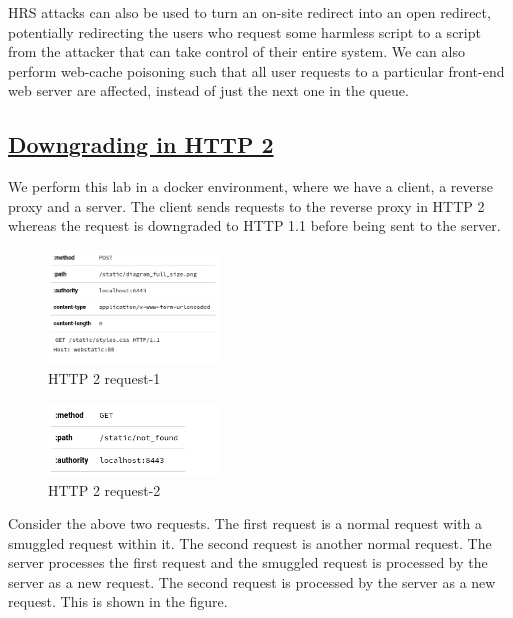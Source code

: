 \documentclass[conference]{IEEEtran}
\begin{document}
\vspace*{2mm}
\par{ \noindent
	HRS attacks can also be used to turn an on-site redirect into an open redirect, potentially redirecting the users who request some harmless script to a script from the attacker that can take control of their entire system. We can also perform web-cache poisoning such that all user requests to a particular front-end web server are affected, instead of just the next one in the queue.   
}

\subsection*{\href{https://github.com/GoSecure/request-smuggling-workshop}{Downgrading in HTTP 2}}
We perform this lab in a docker environment, where we have a client, a reverse proxy and a server. The client sends requests to the reverse proxy in HTTP 2 whereas the request is downgraded to HTTP 1.1 before being sent to the server. 
\begin{figure}[htbp]
	\centering
	\includegraphics[width=0.4\textwidth]{results/request-1.png}
	\caption{HTTP 2 request-1}
	\label{fig:te.cl.detection}
\end{figure}

\begin{figure}[htbp]
	\centering
	\includegraphics[width=0.4\textwidth]{results/request-2.png}
	\caption{HTTP 2 request-2}
	\label{fig:te.cl.detection}
\end{figure}

Consider the above two requests. The first request is a normal request with a smuggled request within it. The second request is another normal request. The server processes the first request and the smuggled request is processed by the server as a new request. The second request is processed by the server as a new request. This is shown in the figure.
\end{document}
